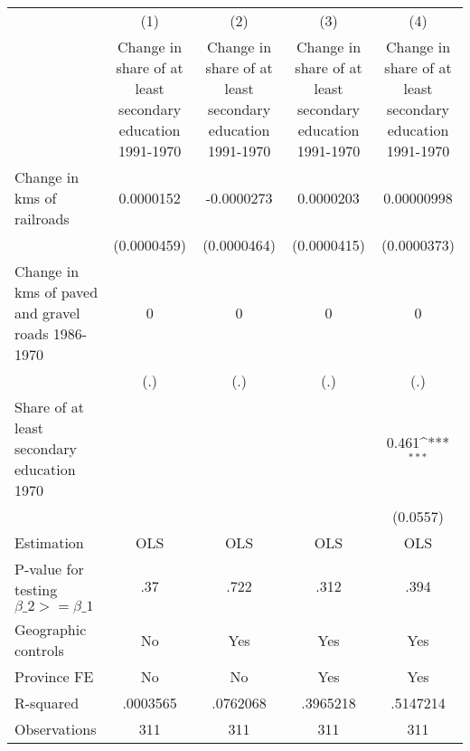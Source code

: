 {
\def\sym#1{\ifmmode^{#1}\else\(^{#1}\)\fi}
\begin{tabular}{l*{4}{c}}
\hline\hline
                &\multicolumn{1}{c}{(1)}&\multicolumn{1}{c}{(2)}&\multicolumn{1}{c}{(3)}&\multicolumn{1}{c}{(4)}\\
                &\multicolumn{1}{c}{Change in share of at least secondary education 1991-1970}&\multicolumn{1}{c}{Change in share of at least secondary education 1991-1970}&\multicolumn{1}{c}{Change in share of at least secondary education 1991-1970}&\multicolumn{1}{c}{Change in share of at least secondary education 1991-1970}\\
\hline
Change in kms of railroads&0.0000152         &-0.0000273         &0.0000203         &0.00000998         \\
                &(0.0000459)         &(0.0000464)         &(0.0000415)         &(0.0000373)         \\
[1em]
Change in kms of paved and gravel roads 1986-1970&        0         &        0         &        0         &        0         \\
                &      (.)         &      (.)         &      (.)         &      (.)         \\
[1em]
Share of at least secondary education 1970&                  &                  &                  &    0.461\sym{***}\\
                &                  &                  &                  & (0.0557)         \\
\hline
Estimation      &      OLS         &      OLS         &      OLS         &      OLS         \\
P-value for testing $\beta\_2 >= \beta\_1$&      .37         &     .722         &     .312         &     .394         \\
Geographic controls&       No         &      Yes         &      Yes         &      Yes         \\
Province FE     &       No         &       No         &      Yes         &      Yes         \\
R-squared       & .0003565         & .0762068         & .3965218         & .5147214         \\
Observations    &      311         &      311         &      311         &      311         \\
\hline\hline
\end{tabular}
}
